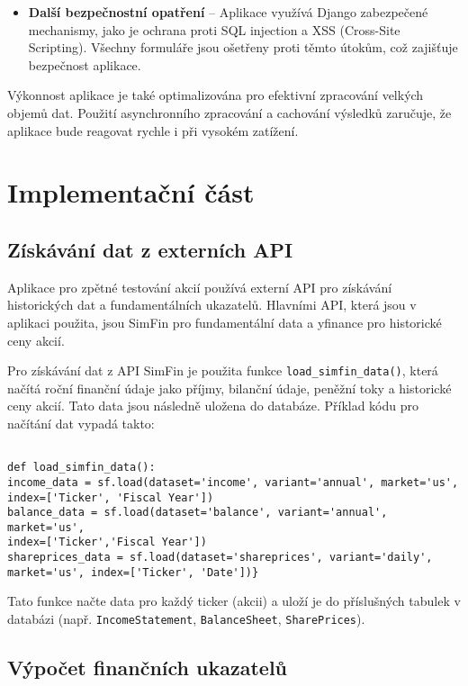 \documentclass[12pt, a4paper]{report}
\begin{document}
\begin{itemize}
    \item \textbf{Další bezpečnostní opatření} – Aplikace využívá Django zabezpečené mechanismy, jako je ochrana proti SQL injection a XSS (Cross-Site Scripting). Všechny formuláře jsou ošetřeny proti těmto útokům, což zajišťuje bezpečnost aplikace.
\end{itemize}

Výkonnost aplikace je také optimalizována pro efektivní zpracování velkých objemů dat. Použití asynchronního zpracování a cachování výsledků zaručuje, že aplikace bude reagovat rychle i při vysokém zatížení.

\chapter{Implementační část}


\section{Získávání dat z externích API}


Aplikace pro zpětné testování akcií používá externí API pro získávání historických dat a fundamentálních ukazatelů. Hlavními API, která jsou v aplikaci použita, jsou SimFin pro fundamentální data a yfinance pro historické ceny akcií.

Pro získávání dat z API SimFin je použita funkce \texttt{load\_simfin\_data()}, která načítá roční finanční údaje jako příjmy, bilanční údaje, peněžní toky a historické ceny akcií. Tato data jsou následně uložena do databáze. Příklad kódu pro načítání dat vypadá takto:

\begin{lstlisting}[style=Python, caption= Simfin data] 

def load_simfin_data():
income_data = sf.load(dataset='income', variant='annual', market='us',
index=['Ticker', 'Fiscal Year'])
balance_data = sf.load(dataset='balance', variant='annual', market='us',
index=['Ticker','Fiscal Year'])
shareprices_data = sf.load(dataset='shareprices', variant='daily',
market='us', index=['Ticker', 'Date'])}
 \end{lstlisting}
Tato funkce načte data pro každý ticker (akcii) a uloží je do příslušných tabulek v databázi (např. \texttt{IncomeStatement}, \texttt{BalanceSheet}, \texttt{SharePrices}).

\section{Výpočet finančních ukazatelů}
\end{document}
